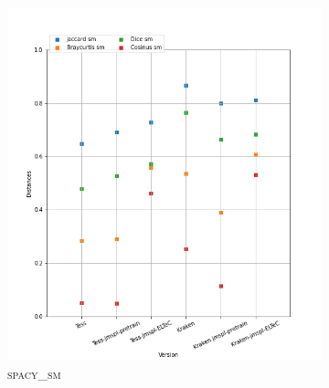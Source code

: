 \begin{figure}
\begin{minipage}{6cm}
\begin{subfigure}{0.89\textwidth}
  \label{fig:BRONTE-dist-stanza }
  \end{subfigure}
  \end{minipage}
  \begin{minipage}{6cm}
  \begin{subfigure}{0.89\textwidth}
  \includegraphics[width=.89\textwidth]{IMAGES/ELTeC_DISTANCES_spaCy3.5.1/BRONTE-Wuthering-heights-graph-dist-spaCy3.5.1-sm.png} 
  \caption{\textsc{spacy\_sm}}
  \label{fig:BRONTE-dist-spaCy3.5.1-sm}
  \end{subfigure}
    \end{minipage}
  \begin{minipage}{6cm}
  \begin{subfigure}{0.89\textwidth}

\end{subfigure}
\end{minipage}
\end{figure}
